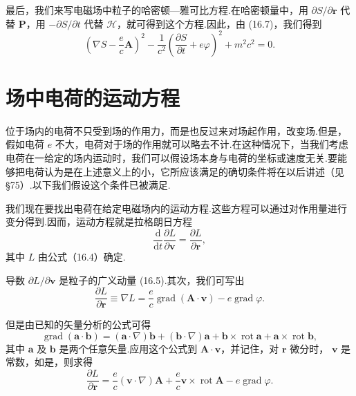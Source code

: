 最后，我们来写电磁场中粒子的哈密顿—雅可比方程.在哈密顿量中，用
$\partial S/\partial\boldsymbol{r}$ 代替 $\boldsymbol{P}$，用 $-\partial S/\partial t$ 代替
$\mathcal{H}$，就可得到这个方程.因此，由 (16.7)，我们得到
\begin{equation}
  \left(\nabla S-\frac{e}{c}\boldsymbol{A}\right)^2
  -\frac{1}{c^2}\left(\frac{\partial S}{\partial t}+e\varphi\right)^2
  +m^2c^2=0.
\end{equation}

\section{场中电荷的运动方程}

位于场内的电荷不只受到场的作用力，而是也反过来对场起作用，改变场.但是，假如电荷 $e$ 不大，电荷对于场的作用就可以略去不计.在这种情况下，当我们考虑电荷在一给定的场内运动时，我们可以假设场本身与电荷的坐标或速度无关.要能够把电荷认为是在上述意义上的小，它所应该满足的确切条件将在以后讲述（见§75）.以下我们假设这个条件已被满足.

我们现在要找出电荷在给定电磁场内的运动方程.这些方程可以通过对作用量进行变分得到.因而，运动方程就是拉格朗日方程
\begin{equation}
  \frac{\mathrm{d}}{\mathrm{d}t}\frac{\partial L}{\partial\boldsymbol{v}}
  =\frac{\partial L}{\partial\boldsymbol{r}},
\end{equation}
其中 $L$ 由公式（16.4）确定.

导数 $\partial L/\partial\boldsymbol{v}$ 是粒子的广义动量 (16.5).其次，我们可写出
\begin{equation*}
  \frac{\partial L}{\partial\boldsymbol{r}}\equiv\nabla L
  =\frac{e}{c}\operatorname{grad}\left(\boldsymbol{A}\cdot\boldsymbol{v}\right)
  -e\operatorname{grad}\varphi.
\end{equation*}

但是由已知的矢量分析的公式可得
\begin{equation*}
  \operatorname{grad}\left(\boldsymbol{a}\cdot\boldsymbol{b}\right)
  =\left(\boldsymbol{a}\cdot\nabla\right)\boldsymbol{b}
  +\left(\boldsymbol{b}\cdot\nabla\right)\boldsymbol{a}
  +\boldsymbol{b}\times\operatorname{rot}\boldsymbol{a}
  +\boldsymbol{a}\times\operatorname{rot}\boldsymbol{b},
\end{equation*}
其中 $\boldsymbol{a}$ 及 $\boldsymbol{b}$ 是两个任意矢量.应用这个公式到
$\boldsymbol{A}\cdot\boldsymbol{v}$，并记住，对 $\boldsymbol{r}$ 微分时，
$\boldsymbol{v}$ 是常数，如是，则求得
\begin{equation*}
  \frac{\partial L}{\partial\boldsymbol{r}}
  =\frac{e}{c}\left(\boldsymbol{v}\cdot\nabla\right)\boldsymbol{A}
  +\frac{e}{c}\boldsymbol{v}\times\operatorname{rot}\boldsymbol{A}
  -e\operatorname{grad}\varphi.
\end{equation*}

